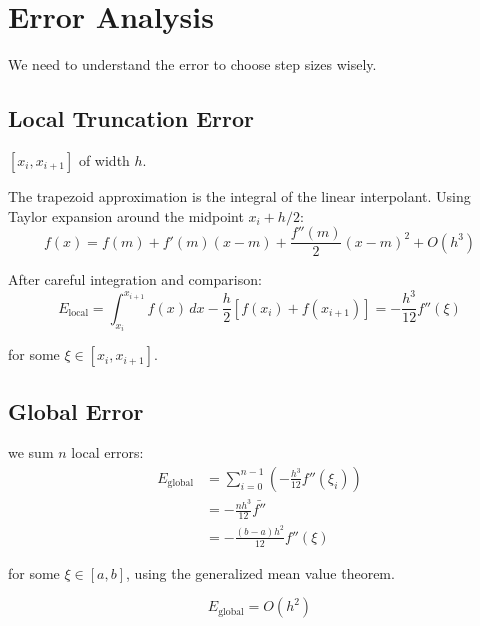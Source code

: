 \newpage
\section{Error Analysis}

 We need to understand the error to choose step sizes wisely.

\subsection{Local Truncation Error}

 $[x_i, x_{i+1}]$ of width $h$.

The trapezoid approximation is the integral of the linear interpolant. Using Taylor expansion around the midpoint $x_i + h/2$:
\begin{equation}
    f(x) = f(m) + f'(m)(x-m) + \frac{f''(m)}{2}(x-m)^2 + O(h^3)
\end{equation}

After careful integration and comparison:
\begin{equation}
    \boxed{E_{\text{local}} = \int_{x_i}^{x_{i+1}} f(x)\,dx - \frac{h}{2}[f(x_i) + f(x_{i+1})] = -\frac{h^3}{12} f''(\xi)}
\end{equation}

for some $\xi \in [x_i, x_{i+1}]$.



\subsection{Global Error}

 we sum $n$ local errors:
\begin{align}
    E_{\text{global}} &= \sum_{i=0}^{n-1} \left(-\frac{h^3}{12} f''(\xi_i)\right) \\
    &= -\frac{nh^3}{12} \bar{f''} \nonumber \\
    &= -\frac{(b-a)h^2}{12} f''(\xi) \nonumber
\end{align}

for some $\xi \in [a,b]$, using the generalized mean value theorem.

\begin{equation}
    \boxed{E_{\text{global}} = O(h^2)}
\end{equation}

